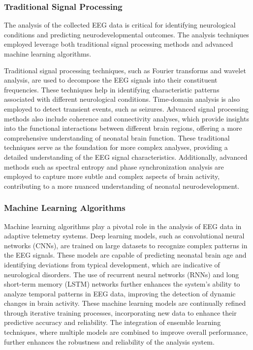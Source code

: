 \documentclass[12pt,journal,compsoc]{IEEEtran}
\begin{document}
\subsubsection{Traditional Signal Processing}

The analysis of the collected EEG data is critical for identifying neurological conditions and predicting neurodevelopmental outcomes. The analysis techniques employed leverage both traditional signal processing methods and advanced machine learning algorithms.

Traditional signal processing techniques, such as Fourier transforms and wavelet analysis, are used to decompose the EEG signals into their constituent frequencies. These techniques help in identifying characteristic patterns associated with different neurological conditions. Time-domain analysis is also employed to detect transient events, such as seizures. Advanced signal processing methods also include coherence and connectivity analyses, which provide insights into the functional interactions between different brain regions, offering a more comprehensive understanding of neonatal brain function. These traditional techniques serve as the foundation for more complex analyses, providing a detailed understanding of the EEG signal characteristics. Additionally, advanced methods such as spectral entropy and phase synchronization analysis are employed to capture more subtle and complex aspects of brain activity, contributing to a more nuanced understanding of neonatal neurodevelopment.

\subsubsection{Machine Learning Algorithms}

Machine learning algorithms play a pivotal role in the analysis of EEG data in adaptive telemetry systems. Deep learning models, such as convolutional neural networks (CNNs), are trained on large datasets to recognize complex patterns in the EEG signals. These models are capable of predicting neonatal brain age and identifying deviations from typical development, which are indicative of neurological disorders. The use of recurrent neural networks (RNNs) and long short-term memory (LSTM) networks further enhances the system's ability to analyze temporal patterns in EEG data, improving the detection of dynamic changes in brain activity. These machine learning models are continually refined through iterative training processes, incorporating new data to enhance their predictive accuracy and reliability. The integration of ensemble learning techniques, where multiple models are combined to improve overall performance, further enhances the robustness and reliability of the analysis system.
\end{document}
